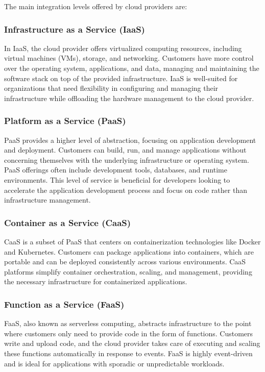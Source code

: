 The main integration levels offered by cloud providers are:

\subsubsection{Infrastructure as a Service (IaaS)}
In IaaS, the cloud provider offers virtualized computing resources, including virtual machines (VMs), storage, and networking.
Customers have more control over the operating system, applications, and data, managing and maintaining the software stack on top of the provided infrastructure.
IaaS is well-suited for organizations that need flexibility in configuring and managing their infrastructure while offloading the hardware management to the cloud provider.

\subsubsection{Platform as a Service (PaaS)}
PaaS provides a higher level of abstraction, focusing on application development and deployment.
Customers can build, run, and manage applications without concerning themselves with the underlying infrastructure or operating system.
PaaS offerings often include development tools, databases, and runtime environments.
This level of service is beneficial for developers looking to accelerate the application development process and focus on code rather than infrastructure management.

\subsubsection{Container as a Service (CaaS)}
CaaS is a subset of PaaS that centers on containerization technologies like Docker and Kubernetes.
Customers can package applications into containers, which are portable and can be deployed consistently across various environments.
CaaS platforms simplify container orchestration, scaling, and management, providing the necessary infrastructure for containerized applications.

\subsubsection{Function as a Service (FaaS)}
FaaS, also known as serverless computing, abstracts infrastructure to the point where customers only need to provide code in the form of functions.
Customers write and upload code, and the cloud provider takes care of executing and scaling these functions automatically in response to events.
FaaS is highly event-driven and is ideal for applications with sporadic or unpredictable workloads.

